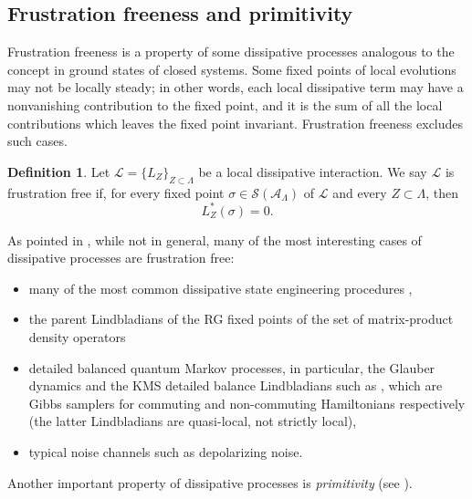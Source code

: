 \documentclass[11pt]{article}
\numberwithin{equation}{section}
\numberwithin{figure}{section}
\numberwithin{table}{section}
\theoremstyle{definition}
\newtheorem{mydef}{Definition}[section]
\theoremstyle{plain}
\theoremstyle{remark}
\newcommand{\Li}{\mathcal{L}}
\newcommand{\A}{\mathcal{A}}
\newcommand{\La}{\Lambda}
\begin{document}

\subsection{Frustration freeness and primitivity}

Frustration freeness is a property of some dissipative processes analogous to the concept in ground states of closed systems. Some fixed points of local evolutions may not be locally steady; in other words, each local dissipative term may have a nonvanishing contribution to the fixed point, and it is the sum of all the local contributions which leaves the fixed point invariant. Frustration freeness excludes such cases.
\medskip

\begin{mydef}\label{def:frustrationFreeness}
    Let $\Li=\{L_Z\}_{Z\subset \La}$ be a local dissipative interaction. We say $\Li$ is frustration free if, for every fixed point $\sigma\in \mathcal{S}(\A_\La)$ of $\Li$ and every $Z\subset\La$, then
    \begin{equation}
        L_Z^*(\sigma)=0.
    \end{equation}
\end{mydef}

As pointed in \cite{brandao_area_2015}, while not in general, many of the most interesting cases of dissipative processes are frustration free:
\begin{itemize}
    \item many of the most common dissipative state engineering procedures \cite{Diehl_2008,verstraete_quantum_2009,Kashyap_2025,baruah2026dissipativepreparationinjectivetensor},
    \item the parent Lindbladians of the RG fixed points of the set of matrix-product density operators \cite{Liu_2026}
    \item detailed balanced quantum Markov processes, in particular, the Glauber dynamics \cite{kastoryano_rapid_2013, kochanowski_rapid_2025} and the KMS detailed balance Lindbladians such as \cite{chen_efficient_2023,Ding_2025,Scandi_2026}, which are Gibbs samplers for commuting and non-commuting Hamiltonians respectively (the latter Lindbladians are quasi-local, not strictly local),
    \item typical noise channels such as depolarizing noise.
\end{itemize}


Another important property of dissipative processes is \emph{primitivity} (see \cite{Sanz_2010}).
\medskip
\end{document}
